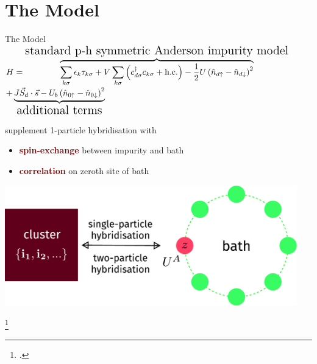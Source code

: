 \documentclass[aspectratio=169]{beamer}
\newcommand{\focus}[1]{\textcolor{maroon}{\textbf{#1}}}
\begin{document}
\section{The Model}
\label{the-model}
\begin{frame}[noframenumbering]{The Model}
\centering
	{\Large\(H = \overbrace{\sum_{k\sigma}\epsilon_k \tau_{k\sigma} + V \sum_{k\sigma}\left(c^\dagger_{d\sigma}c_{k\sigma} + \text{h.c.}\right)  - \frac{1}{2}U \left(\hat n_{d \uparrow} - \hat n_{d \downarrow}\right)^2}^\text{\Large standard p-h symmetric Anderson impurity model}\)\\
	\(+ \underbrace{J \vec{S}_d\cdot\vec{s} - U_b \left(\hat n_{0 \uparrow} - \hat n_{0 \downarrow}\right)^2}_\text{\Large additional terms}\)}

\vspace*{\fill}
\hspace*{-20pt}
\begin{minipage}{0.5\textwidth}
supplement 1-particle hybridisation with 
\begin{itemize}
	\item \focus{spin-exchange} between impurity and bath
	\item \focus{correlation} on zeroth site of bath
\end{itemize}
\end{minipage}
\begin{minipage}{0.5\textwidth}
\hspace*{20pt}
\includegraphics[width=0.95\textwidth]{figures/gen_siam.pdf}
\end{minipage}

\footcite{Schrieffer_Wolff,anderson_impurity_1961}

\end{frame}
\end{document}
